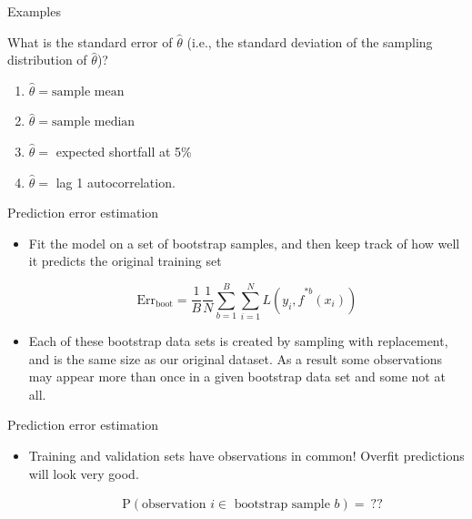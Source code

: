 \documentclass[14pt]{beamer}
\begin{document}
\begin{frame}[plain]{Examples}

What is the standard error of $\hat\theta$ (i.e., the standard deviation of the sampling distribution of $\hat \theta$)?

\begin{enumerate}
	\item $\hat \theta = \text{sample mean}$ 

	\item $\hat \theta = \text{sample median}$

\item $\hat\theta = $ expected shortfall at 5\%

\item $\hat\theta=$ lag 1 autocorrelation.
\end{enumerate}



\end{frame}



\begin{frame}[plain]{Prediction error estimation}

\begin{itemize}
	\item Fit the model on a set of bootstrap samples, and then keep track of how well it predicts the original training set
	
	$$ \text{Err}_{\text{boot}} = \frac1B \frac1N \sum_{b = 1}^B \sum_{i = 1}^N L(y_i, \hat f^{*b}(x_i))$$ 
	\pause
	\item Each of these bootstrap data sets is created by sampling with replacement, and is the same size as our original dataset. As a result some observations may appear more than once in a given bootstrap data set and some not at all.
\end{itemize}

\end{frame}

\begin{frame}[plain]{Prediction error estimation}
%

\begin{itemize}
	\item Training and validation sets have observations in common! Overfit predictions will look very good.
		
\begin{align*}
	&\text{P}(\text{observation~} i \in \text{~bootstrap sample~} b) = ~??
\end{align*}
	
\end{itemize}



\end{frame}
\end{document}
